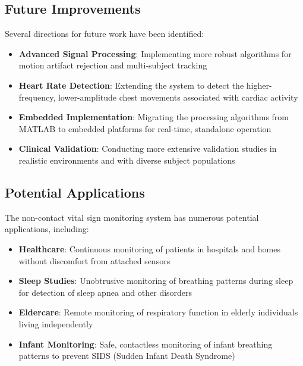 \documentclass[12pt]{article}
\begin{document}
\subsection{Future Improvements}
Several directions for future work have been identified:

\begin{itemize}
    \item \textbf{Advanced Signal Processing}: Implementing more robust algorithms for motion artifact rejection and multi-subject tracking
    
    \item \textbf{Heart Rate Detection}: Extending the system to detect the higher-frequency, lower-amplitude chest movements associated with cardiac activity
    
    \item \textbf{Embedded Implementation}: Migrating the processing algorithms from MATLAB to embedded platforms for real-time, standalone operation
    
    \item \textbf{Clinical Validation}: Conducting more extensive validation studies in realistic environments and with diverse subject populations
\end{itemize}

\subsection{Potential Applications}
The non-contact vital sign monitoring system has numerous potential applications, including:

\begin{itemize}
    \item \textbf{Healthcare}: Continuous monitoring of patients in hospitals and homes without discomfort from attached sensors
    
    \item \textbf{Sleep Studies}: Unobtrusive monitoring of breathing patterns during sleep for detection of sleep apnea and other disorders
    
    \item \textbf{Eldercare}: Remote monitoring of respiratory function in elderly individuals living independently
    
    \item \textbf{Infant Monitoring}: Safe, contactless monitoring of infant breathing patterns to prevent SIDS (Sudden Infant Death Syndrome)
\end{itemize}
\end{document}
